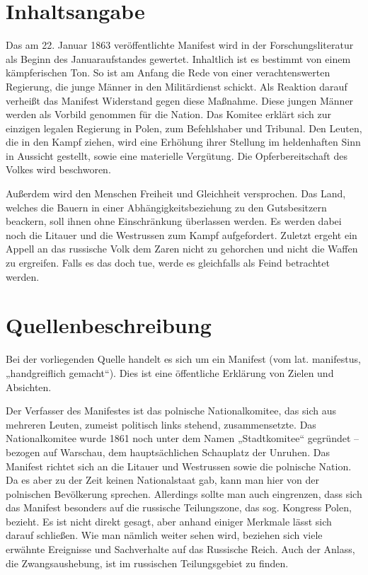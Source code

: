 \documentclass[12pt,headsepline,a4paper]{scrartcl}
\begin{document}
\section{Inhaltsangabe}
Das am 22. Januar 1863 veröffentlichte Manifest wird in der Forschungsliteratur als Beginn des
Januaraufstandes gewertet. Inhaltlich ist es bestimmt von einem kämpferischen Ton. So ist am
Anfang die Rede von einer verachtenswerten Regierung, die junge Männer in den Militärdienst
schickt. Als Reaktion darauf verheißt das Manifest Widerstand gegen diese Maßnahme. Diese
jungen Männer werden als Vorbild genommen für die Nation. Das Komitee erklärt sich zur einzigen
legalen Regierung in Polen, zum Befehlshaber und Tribunal. Den Leuten, die in den Kampf ziehen,
wird eine Erhöhung ihrer Stellung im heldenhaften Sinn in Aussicht gestellt, sowie eine materielle
Vergütung. Die Opferbereitschaft des Volkes wird beschworen.

Außerdem wird den Menschen Freiheit und Gleichheit versprochen. Das Land, welches die Bauern
in einer Abhängigkeitsbeziehung zu den Gutsbesitzern beackern, soll ihnen ohne Einschränkung
überlassen werden. Es werden dabei noch die Litauer und die Westrussen zum Kampf aufgefordert.
Zuletzt ergeht ein Appell an das russische Volk dem Zaren nicht zu gehorchen und nicht die Waffen
zu ergreifen. Falls es das doch tue, werde es gleichfalls als Feind betrachtet werden.

\section{Quellenbeschreibung}
Bei der vorliegenden Quelle handelt es sich um ein Manifest (vom lat. manifestus, „handgreiflich
gemacht“). Dies ist eine öffentliche Erklärung von Zielen und Absichten.

Der Verfasser des Manifestes ist das polnische Nationalkomitee, das sich aus mehreren Leuten,
zumeist politisch links stehend, zusammensetzte. Das Nationalkomitee wurde 1861 noch unter dem
Namen „Stadtkomitee“ gegründet – bezogen auf Warschau, dem hauptsächlichen Schauplatz der
Unruhen. Das Manifest richtet sich an die Litauer und Westrussen sowie die polnische Nation. Da
es aber zu der Zeit keinen Nationalstaat gab, kann man hier von der polnischen Bevölkerung
sprechen. Allerdings sollte man auch eingrenzen, dass sich das Manifest besonders auf die russische
Teilungszone, das sog. Kongress Polen, bezieht. Es ist nicht direkt gesagt, aber anhand einiger
Merkmale lässt sich darauf schließen. Wie man nämlich weiter sehen wird, beziehen sich viele
erwähnte Ereignisse und Sachverhalte auf das Russische Reich. Auch der Anlass, die
Zwangsaushebung, ist im russischen Teilungsgebiet zu finden.
\end{document}

